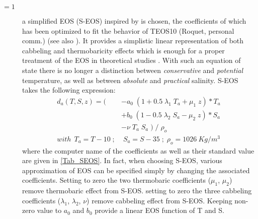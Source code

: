 \documentclass[NEMO_book]{subfiles}
\begin{document}
\begin{description}
\item[$=1$] a simplified EOS (S-EOS) inspired by \citet{Vallis06} is chosen, 
the coefficients of which has been optimized to fit the behavior of TEOS10 (Roquet, personal comm.) 
(see also \citet{Roquet_JPO2015}). It provides a simplistic linear representation of both 
cabbeling and thermobaricity effects which is enough for a proper treatment of the EOS 
in theoretical studies \citep{Roquet_JPO2015}.
With such an equation of state there is no longer a distinction between 
\textit{conservative} and \textit{potential} temperature, as well as between \textit{absolute} 
and \textit{practical} salinity.
S-EOS takes the following expression:
\begin{equation} \label{Eq_tra_S-EOS}
\begin{split}
  d_a(T,S,z)  =  ( & - a_0 \; ( 1 + 0.5 \; \lambda_1 \; T_a + \mu_1 \; z ) * T_a  \\
                                & + b_0 \; ( 1 - 0.5 \; \lambda_2 \; S_a - \mu_2 \; z ) * S_a  \\
                                & - \nu \; T_a \; S_a \;  ) \; / \; \rho_o                     \\
  with \ \  T_a = T-10  \; ;  & \;  S_a = S-35  \; ;\;  \rho_o = 1026~Kg/m^3
\end{split}
\end{equation} 
where the computer name of the coefficients as well as their standard value are given in \ref{Tab_SEOS}.
In fact, when choosing S-EOS, various approximation of EOS can be specified simply by changing 
the associated coefficients. 
Setting to zero the two thermobaric coefficients ($\mu_1$, $\mu_2$) remove thermobaric effect from S-EOS.
setting to zero the three cabbeling coefficients ($\lambda_1$, $\lambda_2$, $\nu$) remove cabbeling effect from S-EOS.
Keeping non-zero value to $a_0$ and $b_0$ provide a linear EOS function of T and S.

\end{description}
\end{document}
